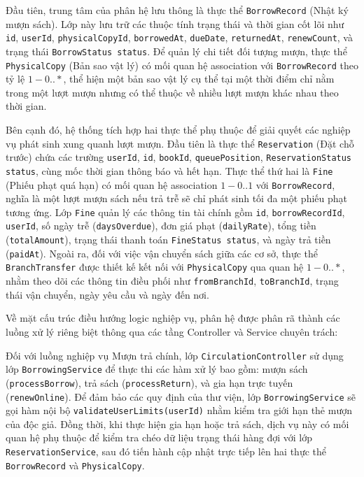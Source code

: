 Đầu tiên, trung tâm của phân hệ lưu thông là thực thể \texttt{BorrowRecord} (Nhật ký mượn sách). Lớp này lưu trữ các thuộc tính trạng thái và thời gian cốt lõi như \texttt{id}, \texttt{userId}, \texttt{physicalCopyId}, \texttt{borrowedAt}, \texttt{dueDate}, \texttt{returnedAt}, \texttt{renewCount}, và trạng thái \texttt{BorrowStatus status}. Để quản lý chi tiết đối tượng mượn, thực thể \texttt{PhysicalCopy} (Bản sao vật lý) có mối quan hệ association với \texttt{BorrowRecord} theo tỷ lệ $1 - 0..*$, thể hiện một bản sao vật lý cụ thể tại một thời điểm chỉ nằm trong một lượt mượn nhưng có thể thuộc về nhiều lượt mượn khác nhau theo thời gian. 

Bên cạnh đó, hệ thống tích hợp hai thực thể phụ thuộc để giải quyết các nghiệp vụ phát sinh xung quanh lượt mượn. Đầu tiên là thực thể \texttt{Reservation} (Đặt chỗ trước) chứa các trường \texttt{userId}, \texttt{id}, \texttt{bookId}, \texttt{queuePosition}, \texttt{ReservationStatus status}, cùng mốc thời gian thông báo và hết hạn. Thực thể thứ hai là \texttt{Fine} (Phiếu phạt quá hạn) có mối quan hệ association $1 - 0..1$ với \texttt{BorrowRecord}, nghĩa là một lượt mượn sách nếu trả trễ sẽ chỉ phát sinh tối đa một phiếu phạt tương ứng. Lớp \texttt{Fine} quản lý các thông tin tài chính gồm \texttt{id}, \texttt{borrowRecordId}, \texttt{userId}, số ngày trễ (\texttt{daysOverdue}), đơn giá phạt (\texttt{dailyRate}), tổng tiền (\texttt{totalAmount}), trạng thái thanh toán \texttt{FineStatus status}, và ngày trả tiền (\texttt{paidAt}). Ngoài ra, đối với việc vận chuyển sách giữa các cơ sở, thực thể \texttt{BranchTransfer} được thiết kế kết nối với \texttt{PhysicalCopy} qua quan hệ $1 - 0..*$, nhằm theo dõi các thông tin điều phối như \texttt{fromBranchId}, \texttt{toBranchId}, trạng thái vận chuyển, ngày yêu cầu và ngày đến nơi.

Về mặt cấu trúc điều hướng logic nghiệp vụ, phân hệ được phân rã thành các luồng xử lý riêng biệt thông qua các tầng Controller và Service chuyên trách:

Đối với luồng nghiệp vụ Mượn trả chính, lớp \texttt{CirculationController} sử dụng lớp \texttt{BorrowingService} để thực thi các hàm xử lý bao gồm: mượn sách (\texttt{processBorrow}), trả sách (\texttt{processReturn}), và gia hạn trực tuyến (\texttt{renewOnline}). Để đảm bảo các quy định của thư viện, lớp \texttt{BorrowingService} sẽ gọi hàm nội bộ \texttt{validateUserLimits(userId)} nhằm kiểm tra giới hạn thẻ mượn của độc giả. Đồng thời, khi thực hiện gia hạn hoặc trả sách, dịch vụ này có mối quan hệ phụ thuộc để kiểm tra chéo dữ liệu trạng thái hàng đợi với lớp \texttt{ReservationService}, sau đó tiến hành cập nhật trực tiếp lên hai thực thể \texttt{BorrowRecord} và \texttt{PhysicalCopy}.

